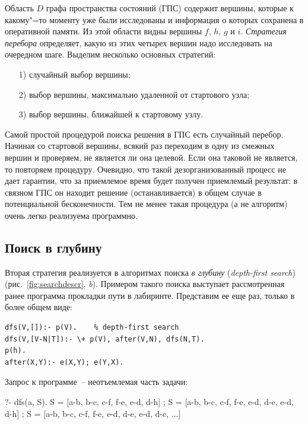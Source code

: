 \documentclass[a4paper,14pt, openany, twoside, final]{extbook} %
\newcommand{\eeng}[1]{\emph{\foreignlanguage{english}{#1}}}
\begin{document}
Область $D$ графа пространства состояний (ГПС) содержит вершины, которые к какому"=то моменту уже были исследованы и информация о которых сохранена в оперативной памяти.  Из этой области видны вершины $f$, $h$, $g$ и $i$.  \emph{Стратегия перебора} определяет, какую из этих четырех вершин надо исследовать на очередном шаге.  Выделим несколько основных стратегий:
\begin{enumerate}[parsep=0pt,itemsep=0pt]
\item[1)] случайный выбор вершины;
\item[2)] выбор вершины, максимально удаленной от стартового узла;
\item[3)] выбор вершины, ближайшей к стартовому узлу.
\end{enumerate}

Самой простой процедурой поиска решения в ГПС есть случайный перебор.  Начиная со стартовой вершины, всякий раз переходим в одну из смежных вершин и проверяем, не является ли она целевой.  Если она таковой не является, то повторяем процедуру.  Очевидно, что такой дезорганизованный процесс не дает гарантии, что за приемлемое время будет получен приемлемый результат: в связном ГПС он находит решение (останавливается) в общем случае в потенциальной бесконечности.  Тем не менее такая процедура (а не алгоритм) очень легко реализуема программно.

\subsection{Поиск в глубину}
\label{sec:depthfirst}

Вторая стратегия реализуется в алгоритмах поиска \emph{в глубину} (\eeng{depth-first search}) (рис.~\ref{fig:searchdescr}, \emph{b}).  Примером такого поиска выступает рассмотренная ранее программа прокладки пути в лабиринте.  Представим ее еще раз, только в более общем виде:

\begin{verbatim}
dfs(V,[]):- p(V).    % depth-first search
dfs(V,[V-N|T]):- \+ p(V), after(V,N), dfs(N,T).
p(h).
after(X,Y):- e(X,Y); e(Y,X).
\end{verbatim}

\noindent{}Запрос к программе~-- неотъемлемая часть задачи:

\begin{proexp}
?- dfs(a, S).
S = [a-b, b-c, c-f, f-e, e-d, d-h] ;
S = [a-b, b-c, c-f, f-e, e-d, d-e, e-d, d-h] ;
S = [a-b, b-c, c-f, f-e, e-d, d-e, e-d, d-e, ...]
\end{proexp}
\end{document}
